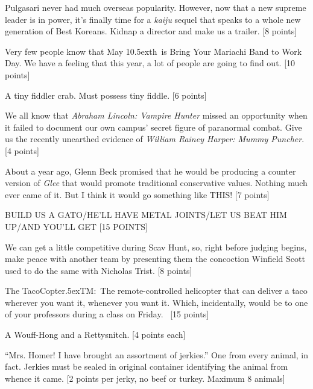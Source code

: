 \documentclass{book}
\def\th{\raise.5ex\hbox{\scriptsize th}}
\def\tm{\raise.5ex\hbox{\scriptsize TM}}
\begin{document}
\begin{list}{}{}
\item Pulgasari never had much overseas popularity. However, now that a new supreme leader is in power, it's finally time for a \emph{kaiju} sequel that speaks to a whole new generation of Best Koreans. Kidnap a director and make us a trailer.  [8 points]

\item Very few people know that May 10\th\ is Bring Your Mariachi Band to Work Day. We have a feeling that this year, a lot of people are going to find out.  [10 points]

\item A tiny fiddler crab. Must possess tiny fiddle.  [6 points]

\item We all know that \emph{Abraham Lincoln: Vampire Hunter} missed an opportunity when it failed to document our own campus' secret figure of paranormal combat. Give us the recently unearthed evidence of \emph{William Rainey Harper: Mummy Puncher}.  [4 points]

\item About a year ago, Glenn Beck promised that he would be producing a counter version of \emph{Glee} that would promote traditional conservative values. Nothing much ever came of it. But I think it would go something like THIS!  [7 points]

\item BUILD US A GATO/HE'LL HAVE METAL JOINTS/LET US BEAT HIM UP/AND YOU'LL GET [15 POINTS]

\item We can get a little competitive during Scav Hunt, so, right before judging begins, make peace with another team by presenting them the concoction Winfield Scott used to do the same with Nicholas Trist.   [8 points]

\item The TacoCopter\tm:\ The remote-controlled helicopter that can deliver a taco wherever you want it, whenever you want it. Which, incidentally, would be to one of your professors during a class on Friday.~ [15 points]

\item A Wouff-Hong and a Rettysnitch.  [4 points each]

\newpage



\item  ``Mrs. Homer! I have brought an assortment of jerkies.'' One from every animal, in fact.  Jerkies must be sealed in original container identifying the animal from whence it came. [2 points per jerky, no beef or turkey. Maximum 8 animals]


\end{list}
\end{document}
